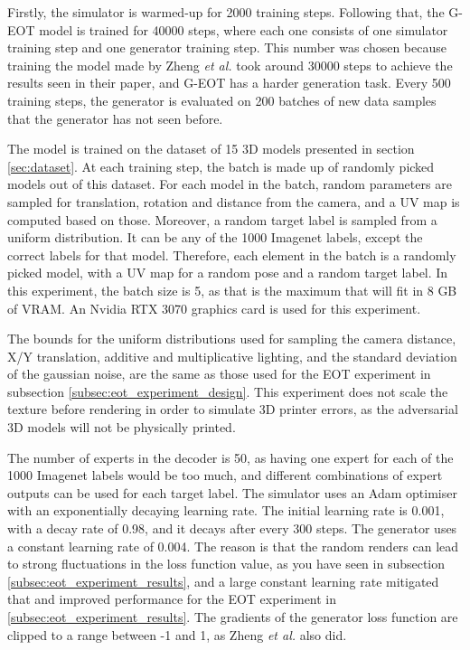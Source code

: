 Firstly, the simulator is warmed-up for 2000 training steps. Following that, the G-EOT model is trained for 40000 steps, where each one consists of one simulator training step and one generator training step. This number was chosen because training the model made by Zheng \textit{et al.} \cite{zheng_black_box_GAN} took around 30000 steps to achieve the results seen in their paper, and G-EOT has a harder generation task. Every 500 training steps, the generator is evaluated on 200 batches of new data samples that the generator has not seen before.

The model is trained on the dataset of 15 3D models presented in section \ref{sec:dataset}. At each training step, the batch is made up of randomly picked models out of this dataset. For each model in the batch, random parameters are sampled for translation, rotation and distance from the camera, and a UV map is computed based on those. Moreover, a random target label is sampled from a uniform distribution. It can be any of the 1000 Imagenet labels, except the correct labels for that model. Therefore, each element in the batch is a randomly picked model, with a UV map for a random pose and a random target label. In this experiment, the batch size is 5, as that is the maximum that will fit in 8 GB of VRAM. An Nvidia RTX 3070 graphics card is used for this experiment.

The bounds for the uniform distributions used for sampling the camera distance, X/Y translation, additive and multiplicative lighting, and the standard deviation of the gaussian noise, are the same as those used for the EOT experiment in subsection \ref{subsec:eot_experiment_design}. This experiment does not scale the texture before rendering in order to simulate 3D printer errors, as the adversarial 3D models will not be physically printed.

The number of experts in the decoder is 50, as having one expert for each of the 1000 Imagenet labels would be too much, and different combinations of expert outputs can be used for each target label. The simulator uses an Adam optimiser with an exponentially decaying learning rate. The initial learning rate is 0.001, with a decay rate of 0.98, and it decays after every 300 steps. The generator uses a constant learning rate of 0.004. The reason is that the random renders can lead to strong fluctuations in the loss function value, as you have seen in subsection \ref{subsec:eot_experiment_results}, and a large constant learning rate mitigated that and improved performance for the EOT experiment in \ref{subsec:eot_experiment_results}. The gradients of the generator loss function are clipped to a range between -1 and 1, as Zheng \textit{et al.} \cite{zheng_black_box_GAN} also did.

